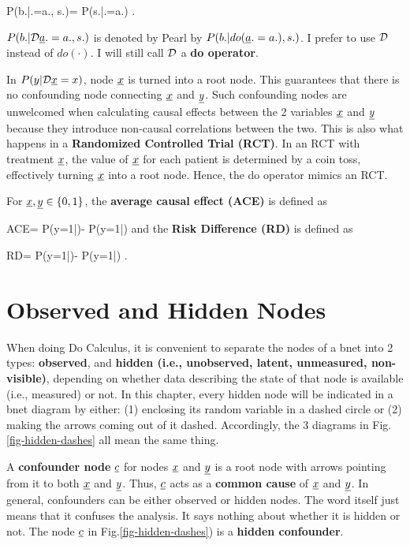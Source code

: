 \beq
P(b.|\cald \rva.=a., s.)=
{P(s.|\cald\rva.=a.)}
\;.
\eeq

$P(b.|\cald \rva.=a., s.)$
is denoted by Pearl  by
$P(b.|do(\rva.=a.), s.)$.
I prefer to
use ${\cal D}$
instead of $do(\cdot)$.
I will still call ${\cal D}$
a {\bf do operator}.



In $P(y|\cald \rvx=x)$,
node $\rvx$ is turned
into a root node. This guarantees
that there is
no confounding node
connecting $\rvx$ and
$\rvy$. Such
confounding nodes
are unwelcomed
when calculating
causal effects
between
the 2 variables $\rvx$ and $\rvy$
 because they
 introduce
non-causal
correlations between
the two.
This is also
what happens
in a {\bf Randomized
Controlled Trial (RCT)}.
In an RCT
 with treatment $\rvx$,
the value
of $\rvx$ for each patient
is determined by a coin toss,
effectively
turning $\rvx$ into a root node.
Hence, the do operator mimics an RCT.



For $\rvx, \rvy\in \bool$,
 the {\bf average causal effect (ACE)}
is defined as

\beq
ACE=
P(y=1|\cald {})-
P(y=1|\cald {})
\eeq
and the
{\bf Risk Difference (RD)}
is defined as

\beq
RD=
P(y=1|)-
P(y=1|)
\;.
\eeq

\section{Observed and Hidden Nodes}

When
doing
Do Calculus,
it is
convenient
to separate
the nodes
of a bnet
into
2  types:
{\bf observed},
and {\bf hidden (i.e., unobserved, latent,
unmeasured, non-visible)},
depending
on
whether data
describing
the
state
of that
node
is available  (i.e., measured) or not.
In this chapter, every
hidden node will
be indicated
in a bnet
diagram by
either: (1)
enclosing
its random variable
in a dashed circle or
(2) making
the arrows
coming
out of it
dashed.
Accordingly,
the
3 diagrams
in
Fig.\ref{fig-hidden-dashes}
all mean the same thing.

A {\bf confounder node} $\rvc$
for nodes $\rvx$ and $\rvy$
is a root node
with arrows
pointing
from it to
both
$\rvx$ and $\rvy$.
Thus, $\rvc$ acts as a {\bf common cause}
of $\rvx$ and $\rvy$.
In general, confounders
can be either observed
or hidden nodes.
The word  itself
just means that it confuses
the analysis.
It says nothing about
whether it is hidden or not.
The node
$\rvc$
in Fig.\ref{fig-hidden-dashes})
is a {\bf hidden confounder}.

